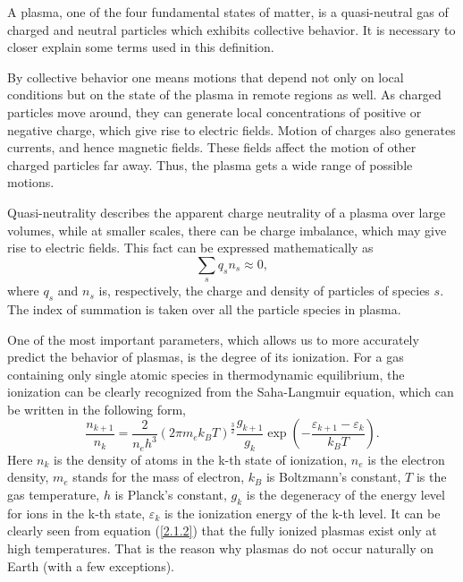 A plasma, one of the four fundamental states of matter, is a quasi-neutral gas of charged and neutral particles which exhibits collective behavior. It is necessary to closer explain some terms used in this definition.

By collective behavior one means motions that depend not only on local conditions but on the state of the plasma in remote regions as well. As charged particles move around, they can generate local concentrations of positive or negative charge, which give rise to electric fields. Motion of charges also generates currents, and hence magnetic fields. These fields affect the motion of other charged particles far away. Thus, the plasma gets a wide range of possible motions.

Quasi-neutrality describes the apparent charge neutrality of a plasma over large volumes, while at smaller scales, there can be charge imbalance, which may give rise to electric fields. This fact can be expressed mathematically as
\begin{equation}
\label{2.1.1}
\sum_{s} q_s n_s \approx 0,
\end{equation}
where $ q_s $ and $ n_s $ is, respectively, the charge and density of particles of species $ s $. The index of summation is taken over all the particle species in plasma.

One of the most important parameters, which allows us to more accurately predict the behavior of plasmas, is the degree of its ionization. For a gas containing only single atomic species in thermodynamic equilibrium, the ionization can be clearly recognized from the Saha-Langmuir equation, which can be written in the following form,
\begin{equation}
\label{2.1.2}
\frac{n_{k+1}}{n_k} = \frac{2}{n_e h^3}\left(2\pi m_e k_B T\right)^{\frac{3}{2}} \frac{g_{k+1}}{g_k} \exp\left(-\frac{\varepsilon_{k+1} - \varepsilon_{k}}{k_{B} T} \right).
\end{equation}
Here $ n_k $ is the density of atoms in the k-th state of ionization, $ n_e $ is the electron density, $ m_e $ stands for the mass of electron, $ k_B $ is Boltzmann's constant, $ T $ is the gas temperature, $ h $ is Planck's constant, $ g_k $ is the degeneracy of the energy level for ions in the k-th state, $ \varepsilon_k $ is the ionization energy of the k-th level. It can be clearly seen from equation (\ref{2.1.2}) that the fully ionized plasmas exist only at high temperatures. That is the reason why plasmas do not occur naturally on Earth (with a few exceptions).

